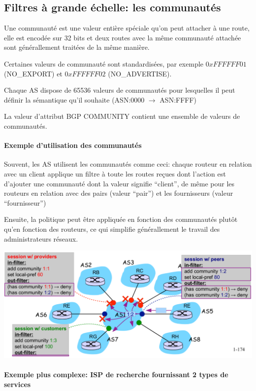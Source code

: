 \documentclass{article}
\begin{document}
\begin{sffamily}
\subsection{Filtres à grande échelle: les communautés}

Une communauté est une valeur entière spéciale qu'on peut attacher à
une route, elle est encodée sur 32 bits et deux routes avec la même
communauté attachée sont générallement traitées de la même manière.

Certaines valeurs de communauté sont standardisées, par exemple
$0xFFFFFF01$ (NO\_EXPORT) et $0xFFFFFF02$ (NO\_ADVERTISE).

Chaque AS dispose de 65536 valeurs de communautés pour lesquelles il
peut définir la sémantique qu'il souhaite (ASN:0000 $\rightarrow$
ASN:FFFF)

La valeur d'attribut BGP COMMUNITY contient une ensemble de valeurs de
communautés.

\paragraph{Exemple d'utilisation des communautés}

Souvent, les AS utilisent les communautés comme ceci: chaque routeur
en relation avec un client applique un filtre à toute les routes
reçues dont l'action est d'ajouter une communauté dont la valeur
signifie ``client'', de même pour les routeurs en relation avec des
pairs (valeur ``pair'') et les fournisseurs (valeur ``fournisseur'')

Ensuite, la politique peut être appliquée en fonction des communautés
plutôt qu'en fonction des routeurs, ce qui simplifie générallement le
travail des administrateurs réseaux.

\includegraphics[width=\textwidth]{fab_011.pdf}

\paragraph{Exemple plus complexe: ISP de recherche fournissant 2 types de
  services}


\end{sffamily}
\end{document}
